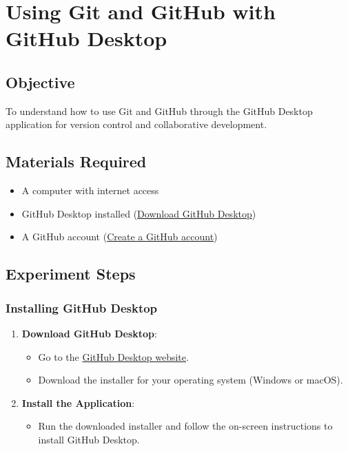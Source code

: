 \section{Using Git and GitHub with GitHub Desktop}

\subsection{Objective}

To understand how to use Git and GitHub through the GitHub Desktop application for version control and collaborative development.

\subsection{Materials Required}

\begin{itemize}
    \item A computer with internet access
    \item GitHub Desktop installed (\href{https://desktop.github.com/}{Download GitHub Desktop})
    \item A GitHub account (\href{https://github.com/join}{Create a GitHub account})
\end{itemize}

\subsection{Experiment Steps}

\subsubsection{Installing GitHub Desktop}

\begin{enumerate}
    \item \textbf{Download GitHub Desktop}:
    \begin{itemize}
        \item Go to the \href{https://desktop.github.com/}{GitHub Desktop website}.
        \item Download the installer for your operating system (Windows or macOS).
    \end{itemize}
    
    \item \textbf{Install the Application}:
    \begin{itemize}
        \item Run the downloaded installer and follow the on-screen instructions to install GitHub Desktop.
    \end{itemize}
\end{enumerate}

